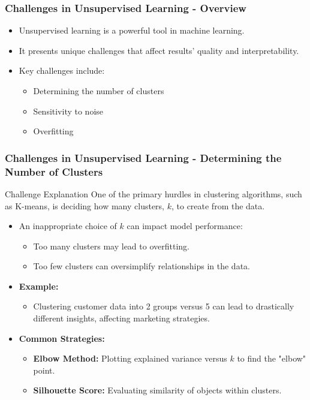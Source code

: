 \documentclass[aspectratio=169]{beamer}
\begin{document}
\begin{frame}[fragile]
    \frametitle{Challenges in Unsupervised Learning - Overview}
    \begin{itemize}
        \item Unsupervised learning is a powerful tool in machine learning.
        \item It presents unique challenges that affect results' quality and interpretability.
        \item Key challenges include:
        \begin{itemize}
            \item Determining the number of clusters
            \item Sensitivity to noise
            \item Overfitting
        \end{itemize}
    \end{itemize}
\end{frame}

\begin{frame}[fragile]
    \frametitle{Challenges in Unsupervised Learning - Determining the Number of Clusters}
    \begin{block}{Challenge Explanation}
        One of the primary hurdles in clustering algorithms, such as K-means, is deciding how many clusters, \( k \), to create from the data.
    \end{block}
    \begin{itemize}
        \item An inappropriate choice of \( k \) can impact model performance:
            \begin{itemize}
                \item Too many clusters may lead to overfitting.
                \item Too few clusters can oversimplify relationships in the data.
            \end{itemize}
        \item \textbf{Example:}
            \begin{itemize}
                \item Clustering customer data into 2 groups versus 5 can lead to drastically different insights, affecting marketing strategies.
            \end{itemize}
        \item \textbf{Common Strategies:}
            \begin{itemize}
                \item \textbf{Elbow Method:} Plotting explained variance versus \( k \) to find the "elbow" point.
                \item \textbf{Silhouette Score:} Evaluating similarity of objects within clusters.
            \end{itemize}
    \end{itemize}
\end{frame}
\end{document}

